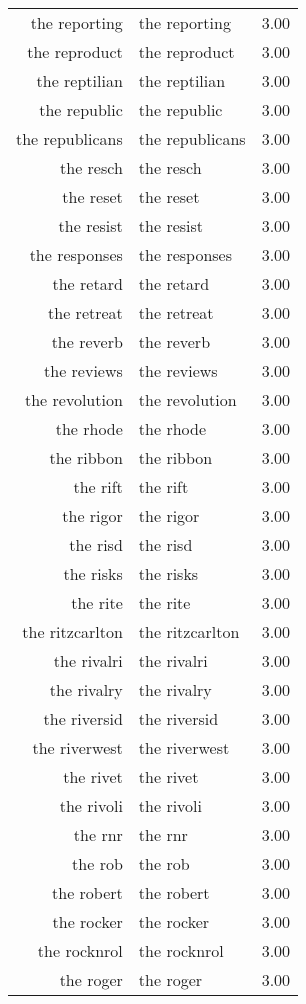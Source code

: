 \begin{table}[ht]
\begin{tabular}{rlr}
  the reporting & the reporting & 3.00 \\ 
  the reproduct & the reproduct & 3.00 \\ 
  the reptilian & the reptilian & 3.00 \\ 
  the republic & the republic & 3.00 \\ 
  the republicans & the republicans & 3.00 \\ 
  the resch & the resch & 3.00 \\ 
  the reset & the reset & 3.00 \\ 
  the resist & the resist & 3.00 \\ 
  the responses & the responses & 3.00 \\ 
  the retard & the retard & 3.00 \\ 
  the retreat & the retreat & 3.00 \\ 
  the reverb & the reverb & 3.00 \\ 
  the reviews & the reviews & 3.00 \\ 
  the revolution & the revolution & 3.00 \\ 
  the rhode & the rhode & 3.00 \\ 
  the ribbon & the ribbon & 3.00 \\ 
  the rift & the rift & 3.00 \\ 
  the rigor & the rigor & 3.00 \\ 
  the risd & the risd & 3.00 \\ 
  the risks & the risks & 3.00 \\ 
  the rite & the rite & 3.00 \\ 
  the ritzcarlton & the ritzcarlton & 3.00 \\ 
  the rivalri & the rivalri & 3.00 \\ 
  the rivalry & the rivalry & 3.00 \\ 
  the riversid & the riversid & 3.00 \\ 
  the riverwest & the riverwest & 3.00 \\ 
  the rivet & the rivet & 3.00 \\ 
  the rivoli & the rivoli & 3.00 \\ 
  the rnr & the rnr & 3.00 \\ 
  the rob & the rob & 3.00 \\ 
  the robert & the robert & 3.00 \\ 
  the rocker & the rocker & 3.00 \\ 
  the rocknrol & the rocknrol & 3.00 \\ 
  the roger & the roger & 3.00 \\ 

\end{tabular}
\end{table}
